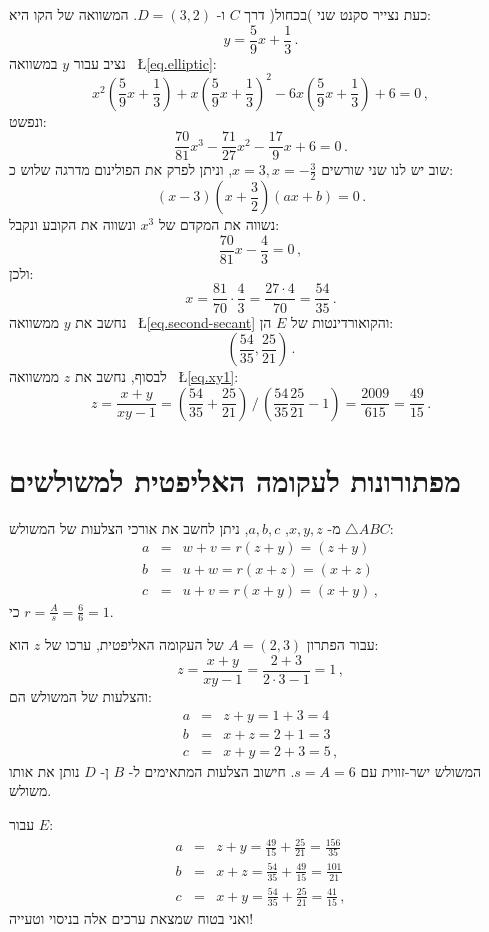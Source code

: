 \documentclass[12pt,a4paper]{article}
\begin{document}
כעת נצייר  סקנט שני )בכחול( דרך 
$C$
ו-%
$D=(3,2)$.
המשוואה של הקו היא:
\begin{equation}
y = \frac{5}{9}x + \frac{1}{3}\,.\label{eq.second-secant}
\end{equation}
נציב עבור 
$y$
במשוואה 
~\L{\ref{eq.elliptic}}:
\[
x^2\left(\frac{5}{9}x + \frac{1}{3}\right) + x\left(\frac{5}{9}x + \frac{1}{3}\right)^2 -6x\left(\frac{5}{9}x + \frac{1}{3}\right) +6 =0\,,
\]
ונפשט:
\[
\frac{70}{81}x^3 - \frac{71}{27}x^2 - \frac{17}{9}x +6 =0\,.
\]
שוב יש לנו שני שורשים
$x=3,x=-\frac{3}{2}$,
וניתן לפרק את הפולינום מדרגה שלוש כ:
\[
(x-3)(x+\frac{3}{2})(ax+b)=0\,.
\]
נשווה את המקדם של 
$x^3$
ונשווה את הקובע ונקבל:
\[
\frac{70}{81}x - \frac{4}{3}=0\,,
\]
ולכן:
\[
x=\frac{81}{70}\cdot \frac{4}{3}= \frac{27\cdot 4}{70} = \frac{54}{35}\,.
\]
נחשב את
$y$
ממשוואה
~\L{\ref{eq.second-secant}}
והקואורדינטות של
$E$
הן:
\[
\left(\frac{54}{35}, \frac{25}{21}\right)\,.
\]
לבסוף, נחשב את
$z$
ממשוואה
~\L{\ref{eq.xy1}}:
\[
z=\frac{x+y}{xy-1}=%
\displaystyle\left(\frac{54}{35} + \frac{25}{21}\right)%
 \, / \,%
\displaystyle\left(\frac{54}{35}\frac{25}{21}-1\right)=%
\frac{2009}{615} = \frac{49}{15}\,.
\]

\section{מפתורונות לעקומה האליפטית למשולשים}

מ-%
$x,y,z$, $a,b,c$, 
ניתן לחשב את אורכי הצלעות של המשולש
$\triangle ABC$:
\begin{eqnarray*}
a&=&w+v = r(z+y)=(z+y)\\
b&=&u+w= r(x+z)=(x+z)\\
c&=&u+v=r(x+y)=(x+y)\,,
\end{eqnarray*}
כי
$\displaystyle r=\frac{A}{s}=\frac{6}{6}=1$.

עבור הפתרון 
$A=(2,3)$
של העקומה האליפטית, ערכו של
$z$
הוא:
\[
z=\frac{x+y}{xy-1}=\frac{2+3}{2\cdot 3-1}=1\,,
\]
והצלעות של המשולש הם:
\begin{eqnarray*}
a &=& z+y = 1+3 = 4\\
b &=& x+z = 2+1=3\\
c &=& x+y = 2+3=5\,,
\end{eqnarray*}
המשולש ישר-זווית עם
$s=A=6$.
חישוב הצלעות המתאימים ל-%
$B$
ן-%
$D$
נותן את אותו משולש.

עבור
$E$:
\begin{eqnarray*}
a &=& z+y = \frac{49}{15} + \frac{25}{21} = \frac{156}{35}\\
b &=& x+z = \frac{54}{35} + \frac{49}{15} = \frac{101}{21}\\
c &=& x+y = \frac{54}{35} + \frac{25}{21}  = \frac{41}{15}\,,
\end{eqnarray*}
ואני בטוח שמצאת ערכים אלה בניסוי וטעייה!
\end{document}

